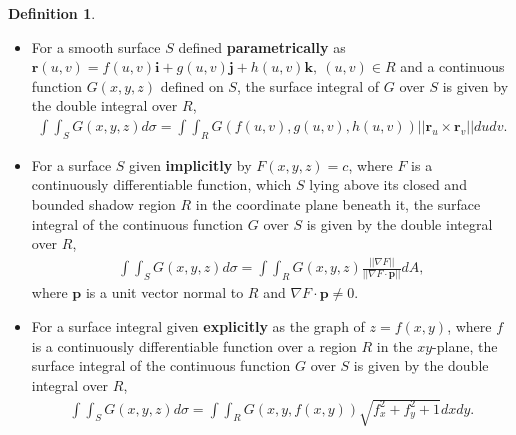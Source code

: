\documentclass[12pt, letter]{article}
\theoremstyle{plain}
\numberwithin{theorem}{section}
\theoremstyle{definition}
\newtheorem{definition}[theorem]{Definition}
\begin{document}
\begin{definition}
\begin{itemize}
\item For a smooth surface $S$ defined \textbf{parametrically} as $\bm{r}(u,v) = f(u,v)\bm{i}+g(u,v)\bm{j}+h(u,v)\bm{k}, \ (u,v)\in R$ and a continuous function $G(x,y,z)$ defined on $S$, the surface integral of $G$ over $S$ is given by the double integral over $R$,
\begin{align*}
\int\int_S G(x,y,z)d\sigma = \int\int_R G(f(u,v),g(u,v),h(u,v)) ||\bm{r}_u\times\bm{r}_v||dudv.
\end{align*}
\item For a surface $S$ given \textbf{implicitly} by $F(x,y,z)=c$, where $F$ is a continuously differentiable function, which $S$ lying above its closed and bounded shadow region $R$ in the coordinate plane beneath it, the surface integral of the continuous function $G$ over $S$ is given by the double integral over $R$,
\begin{align*}
\int\int_S G(x,y,z)d\sigma = \int\int_R G(x,y,z) \frac{||\nabla F||}{||\nabla F\cdot\bm{p}||} dA,
\end{align*}
where $\bm{p}$ is a unit vector normal to $R$ and $\nabla F \cdot \bm{p} \neq 0$.
\item For a surface integral given \textbf{explicitly} as the graph of $z=f(x,y)$, where $f$ is a continuously differentiable function over a region $R$ in the $xy$-plane, the surface integral of the continuous function $G$ over $S$ is given by the double integral over $R$,
\begin{align*}
\int\int_S G(x,y,z)d\sigma = \int\int_R G(x,y,f(x,y)) \sqrt{f_x^2+f_y^2+1}dxdy.
\end{align*}
\end{itemize}
\end{definition}

\bigskip

\hrulefill

\bigskip
\end{document}
